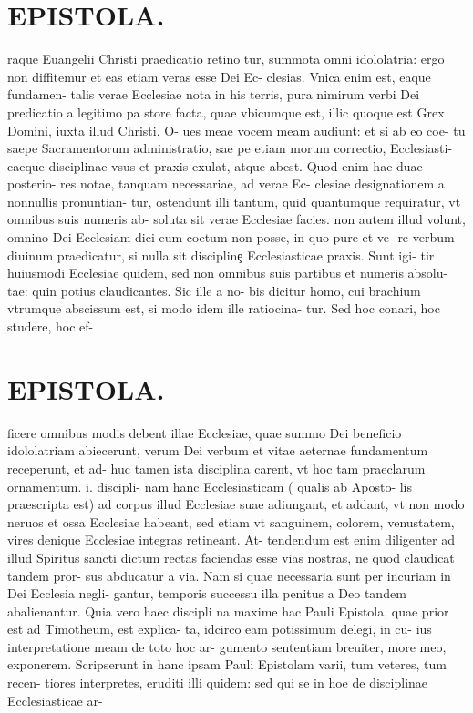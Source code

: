 \documentclass{article}
\begin{document}
\begin{pages}
\section*{EPISTOLA. }\pstart raque Euangelii Christi praedicatio retino tur, summota omni idololatria: ergo non diffitemur et eas etiam veras esse Dei Ec- clesias. Vnica enim est, eaque fundamen- talis verae Ecclesiae nota in his terris, pura nimirum verbi Dei predicatio a legitimo pa store facta, quae vbicumque est, illic quoque est Grex Domini, iuxta illud Christi, O- ues meae vocem meam audiunt: et si ab eo coe- tu saepe Sacramentorum administratio, sae pe etiam morum correctio, Ecclesiasti- caeque disciplinae vsus et praxis exulat, atque abest. Quod enim hae duae posterio- res notae, tanquam necessariae, ad verae Ec- clesiae designationem a nonnullis pronuntian- tur, ostendunt illi tantum, quid quantumque requiratur, vt omnibus suis numeris ab- soluta sit verae Ecclesiae facies. non autem illud volunt, omnino Dei Ecclesiam dici eum coetum non posse, in quo pure et ve- re verbum diuinum praedicatur, si nulla sit disciplinȩ Ecclesiasticae praxis. Sunt igi- tir huiusmodi Ecclesiae quidem, sed non omnibus suis partibus et numeris absolu- tae: quin potius claudicantes. Sic ille a no- bis dicitur homo, cui brachium vtrumque abscissum est, si modo idem ille ratiocina- tur. Sed hoc conari, hoc studere, hoc ef-  \pend
\section*{EPISTOLA. }\pstart ficere omnibus modis debent illae Ecclesiae, quae summo Dei beneficio idololatriam abiecerunt, verum Dei verbum et vitae aeternae fundamentum receperunt, et ad- huc tamen ista disciplina carent, vt hoc tam praeclarum ornamentum. i. discipli- nam hanc Ecclesiasticam ( qualis ab Aposto- lis praescripta est) ad corpus illud Ecclesiae suae adiungant, et addant, vt non modo neruos et ossa Ecclesiae habeant, sed etiam vt sanguinem, colorem, venustatem, vires denique Ecclesiae integras retineant. At- tendendum est enim diligenter ad illud Spiritus sancti dictum rectas faciendas esse vias nostras, ne quod claudicat tandem pror- sus abducatur a via. Nam si quae necessaria sunt per incuriam in Dei Ecclesia negli- gantur, temporis successu illa penitus a Deo tandem abalienantur. Quia vero haec discipli na maxime hac Pauli Epistola, quae prior est ad Timotheum, est explica- ta, idcirco eam potissimum delegi, in cu- ius interpretatione meam de toto hoc ar- gumento sententiam breuiter, more meo, exponerem. Scripserunt in hanc ipsam Pauli Epistolam varii, tum veteres, tum recen- tiores interpretes, eruditi illi quidem: sed qui se in hoe de disciplinae Ecclesiasticae ar-  \pend

\end{pages}
\end{document}
